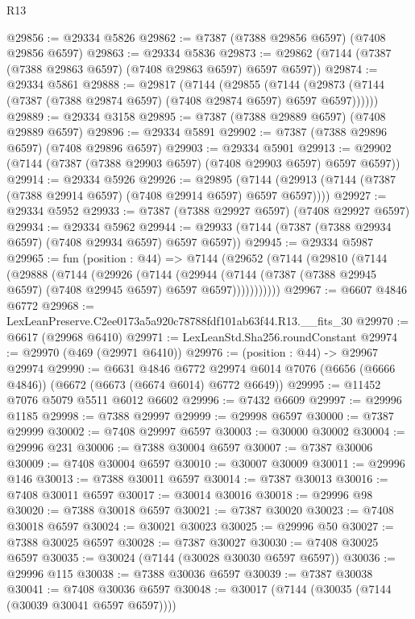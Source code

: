 \begin{lexlean}{R13}
\begin{coremodule}
@29856 := @29334 @5826
@29862 := @7387 (@7388 @29856 @6597) (@7408 @29856 @6597)
@29863 := @29334 @5836
@29873 := @29862 (@7144 (@7387 (@7388 @29863 @6597) (@7408 @29863 @6597) @6597 @6597))
@29874 := @29334 @5861
@29888 := @29817
    (@7144
      (@29855
        (@7144 (@29873 (@7144 (@7387 (@7388 @29874 @6597) (@7408 @29874 @6597) @6597 @6597))))))
@29889 := @29334 @3158
@29895 := @7387 (@7388 @29889 @6597) (@7408 @29889 @6597)
@29896 := @29334 @5891
@29902 := @7387 (@7388 @29896 @6597) (@7408 @29896 @6597)
@29903 := @29334 @5901
@29913 := @29902 (@7144 (@7387 (@7388 @29903 @6597) (@7408 @29903 @6597) @6597 @6597))
@29914 := @29334 @5926
@29926 := @29895
    (@7144 (@29913 (@7144 (@7387 (@7388 @29914 @6597) (@7408 @29914 @6597) @6597 @6597))))
@29927 := @29334 @5952
@29933 := @7387 (@7388 @29927 @6597) (@7408 @29927 @6597)
@29934 := @29334 @5962
@29944 := @29933 (@7144 (@7387 (@7388 @29934 @6597) (@7408 @29934 @6597) @6597 @6597))
@29945 := @29334 @5987
@29965 := fun (position : @44) =>
  @7144
    (@29652
      (@7144
        (@29810
          (@7144
            (@29888
              (@7144
                (@29926
                  (@7144
                    (@29944
                      (@7144 (@7387 (@7388 @29945 @6597) (@7408 @29945 @6597) @6597 @6597)))))))))))
@29967 := @6607 @4846 @6772
@29968 := LexLeanPreserve.C2ee0173a5a920c78788fdf101ab63f44.R13.__fits_30
@29970 := @6617 (@29968 @6410)
@29971 := LexLeanStd.Sha256.roundConstant
@29974 := @29970 (@469 (@29971 @6410))
@29976 := (position : @44) -> @29967 @29974
@29990 := @6631
    @4846
    @6772
    @29974
    @6014
    @7076
    (@6656 (@6666 @4846))
    (@6672 (@6673 (@6674 @6014) @6772 @6649))
@29995 := @11452 @7076 @5079 @5511 @6012 @6602
@29996 := @7432 @6609
@29997 := @29996 @1185
@29998 := @7388 @29997
@29999 := @29998 @6597
@30000 := @7387 @29999
@30002 := @7408 @29997 @6597
@30003 := @30000 @30002
@30004 := @29996 @231
@30006 := @7388 @30004 @6597
@30007 := @7387 @30006
@30009 := @7408 @30004 @6597
@30010 := @30007 @30009
@30011 := @29996 @146
@30013 := @7388 @30011 @6597
@30014 := @7387 @30013
@30016 := @7408 @30011 @6597
@30017 := @30014 @30016
@30018 := @29996 @98
@30020 := @7388 @30018 @6597
@30021 := @7387 @30020
@30023 := @7408 @30018 @6597
@30024 := @30021 @30023
@30025 := @29996 @50
@30027 := @7388 @30025 @6597
@30028 := @7387 @30027
@30030 := @7408 @30025 @6597
@30035 := @30024 (@7144 (@30028 @30030 @6597 @6597))
@30036 := @29996 @115
@30038 := @7388 @30036 @6597
@30039 := @7387 @30038
@30041 := @7408 @30036 @6597
@30048 := @30017 (@7144 (@30035 (@7144 (@30039 @30041 @6597 @6597))))

\end{coremodule}
\end{lexlean}
